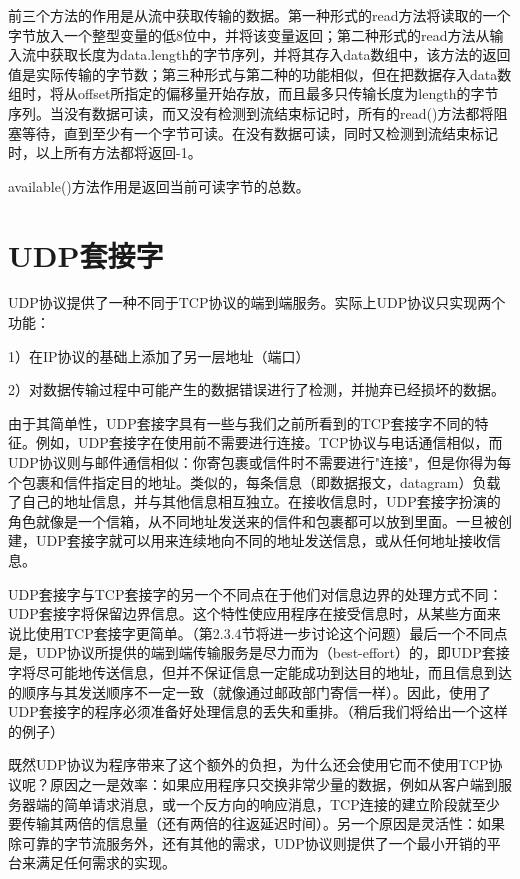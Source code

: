 		前三个方法的作用是从流中获取传输的数据。第一种形式的read方法将读取的一个字节放入一个整型变量的低8位中，并将该变量返回；第二种形式的read方法从输入流中获取长度为data.length的字节序列，并将其存入data数组中，该方法的返回值是实际传输的字节数；第三种形式与第二种的功能相似，但在把数据存入data数组时，将从offset所指定的偏移量开始存放，而且最多只传输长度为length的字节序列。当没有数据可读，而又没有检测到流结束标记时，所有的read()方法都将阻塞等待，直到至少有一个字节可读。在没有数据可读，同时又检测到流结束标记时，以上所有方法都将返回-1。 

		available()方法作用是返回当前可读字节的总数。
		

\section{UDP套接字} 

	UDP协议提供了一种不同于TCP协议的端到端服务。实际上UDP协议只实现两个功能：
	
	1）在IP协议的基础上添加了另一层地址（端口）
	
	2）对数据传输过程中可能产生的数据错误进行了检测，并抛弃已经损坏的数据。
	
	由于其简单性，UDP套接字具有一些与我们之前所看到的TCP套接字不同的特征。例如，UDP套接字在使用前不需要进行连接。TCP协议与电话通信相似，而UDP协议则与邮件通信相似：你寄包裹或信件时不需要进行"连接"，但是你得为每个包裹和信件指定目的地址。类似的，每条信息（即数据报文，datagram）负载了自己的地址信息，并与其他信息相互独立。在接收信息时，UDP套接字扮演的角色就像是一个信箱，从不同地址发送来的信件和包裹都可以放到里面。一旦被创建，UDP套接字就可以用来连续地向不同的地址发送信息，或从任何地址接收信息。 

	UDP套接字与TCP套接字的另一个不同点在于他们对信息边界的处理方式不同：UDP套接字将保留边界信息。这个特性使应用程序在接受信息时，从某些方面来说比使用TCP套接字更简单。（第2.3.4节将进一步讨论这个问题）最后一个不同点是，UDP协议所提供的端到端传输服务是尽力而为（best-effort）的，即UDP套接字将尽可能地传送信息，但并不保证信息一定能成功到达目的地址，而且信息到达的顺序与其发送顺序不一定一致（就像通过邮政部门寄信一样）。因此，使用了UDP套接字的程序必须准备好处理信息的丢失和重排。（稍后我们将给出一个这样的例子） 

	既然UDP协议为程序带来了这个额外的负担，为什么还会使用它而不使用TCP协议呢？原因之一是效率：如果应用程序只交换非常少量的数据，例如从客户端到服务器端的简单请求消息，或一个反方向的响应消息，TCP连接的建立阶段就至少要传输其两倍的信息量（还有两倍的往返延迟时间）。另一个原因是灵活性：如果除可靠的字节流服务外，还有其他的需求，UDP协议则提供了一个最小开销的平台来满足任何需求的实现。

